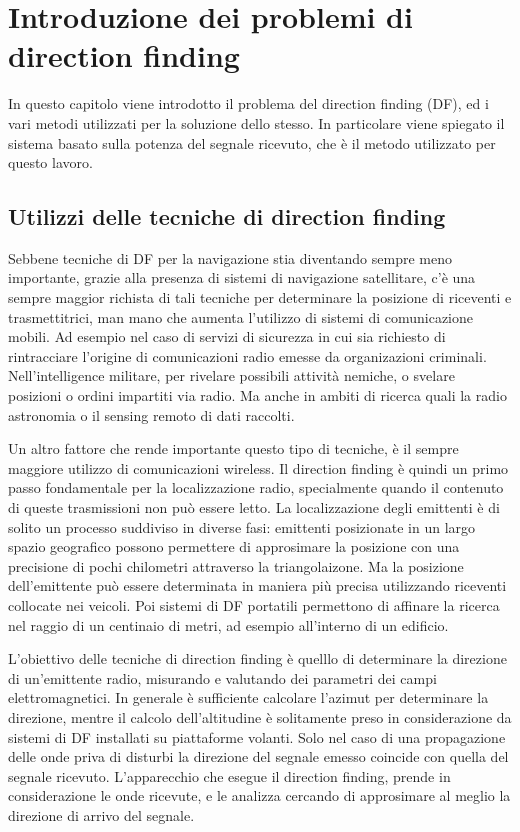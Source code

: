 \section{Introduzione dei problemi di direction finding}

In questo capitolo viene introdotto il problema del direction finding (DF), ed i vari metodi utilizzati per la soluzione dello stesso. In particolare viene spiegato il sistema basato sulla potenza del segnale ricevuto, che è il metodo utilizzato per questo lavoro. 

\subsection{Utilizzi delle tecniche di direction finding}
Sebbene tecniche di DF per la navigazione stia diventando sempre meno importante, grazie alla presenza di sistemi di navigazione satellitare, c'è una sempre maggior richista di tali tecniche per determinare la posizione di riceventi e trasmettitrici, man mano che aumenta l'utilizzo di sistemi di comunicazione mobili. Ad esempio nel caso di servizi di sicurezza in cui sia richiesto di rintracciare l'origine di comunicazioni radio emesse da organizazioni criminali. Nell'intelligence militare, per rivelare possibili attività nemiche, o svelare posizioni o ordini impartiti via radio. Ma anche in ambiti di ricerca quali la radio astronomia o il sensing remoto di dati raccolti. 

Un altro fattore che rende importante questo tipo di tecniche, è il sempre maggiore utilizzo di comunicazioni wireless. Il direction finding è quindi un primo passo fondamentale per la localizzazione radio, specialmente quando il contenuto di queste trasmissioni non può essere letto. La localizzazione degli emittenti è di solito un processo suddiviso in diverse fasi: emittenti posizionate in un largo spazio geografico possono permettere di approsimare la posizione con una precisione di pochi chilometri attraverso la triangolaizone. Ma la posizione dell'emittente può essere determinata in maniera più precisa utilizzando riceventi collocate nei veicoli. Poi sistemi di DF portatili permettono di affinare la ricerca nel raggio di un centinaio di metri, ad esempio all'interno di un edificio.

L'obiettivo delle tecniche di direction finding è quelllo di determinare la direzione di un'emittente radio, misurando e valutando dei parametri dei campi elettromagnetici. In generale è sufficiente calcolare l'azimut per determinare la direzione, mentre il calcolo dell'altitudine è solitamente preso in considerazione da sistemi di DF installati su piattaforme volanti. Solo nel caso di una propagazione delle onde priva di disturbi la direzione del segnale emesso coincide con quella del segnale ricevuto. L'apparecchio che esegue il direction finding, prende in considerazione le onde ricevute, e le analizza cercando di approsimare al meglio la direzione di arrivo del segnale.

